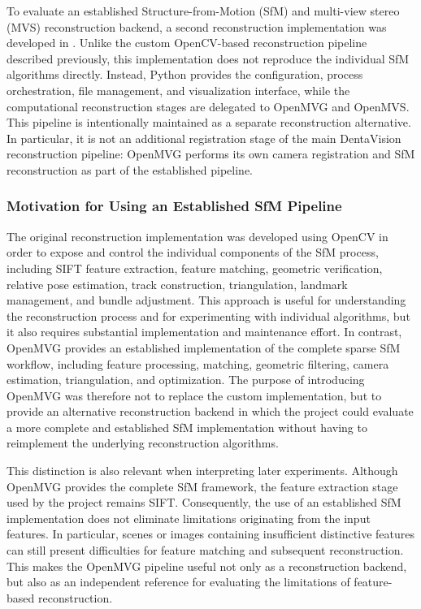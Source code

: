 To evaluate an established Structure-from-Motion (SfM) and multi-view stereo (MVS) reconstruction backend, a second reconstruction implementation was developed in . Unlike the custom OpenCV-based reconstruction pipeline described previously, this implementation does not reproduce the individual SfM algorithms directly. Instead, Python provides the configuration, process orchestration, file management, and visualization interface, while the computational reconstruction stages are delegated to OpenMVG and OpenMVS. This pipeline is intentionally maintained as a separate reconstruction alternative. In particular, it is not an additional registration stage of the main DentaVision reconstruction pipeline: OpenMVG performs its own camera registration and SfM reconstruction as part of the established pipeline.

\subsubsection{Motivation for Using an Established SfM Pipeline}

The original reconstruction implementation was developed using OpenCV in order to expose and control the individual components of the SfM process, including SIFT feature extraction, feature matching, geometric verification, relative pose estimation, track construction, triangulation, landmark management, and bundle adjustment. This approach is useful for understanding the reconstruction process and for experimenting with individual algorithms, but it also requires substantial implementation and maintenance effort. In contrast, OpenMVG provides an established implementation of the complete sparse SfM workflow, including feature processing, matching, geometric filtering, camera estimation, triangulation, and optimization. The purpose of introducing OpenMVG was therefore not to replace the custom implementation, but to provide an alternative reconstruction backend in which the project could evaluate a more complete and established SfM implementation without having to reimplement the underlying reconstruction algorithms.

This distinction is also relevant when interpreting later experiments. Although OpenMVG provides the complete SfM framework, the feature extraction stage used by the project remains SIFT. Consequently, the use of an established SfM implementation does not eliminate limitations originating from the input features. In particular, scenes or images containing insufficient distinctive features can still present difficulties for feature matching and subsequent reconstruction. This makes the OpenMVG pipeline useful not only as a reconstruction backend, but also as an independent reference for evaluating the limitations of feature-based reconstruction.

